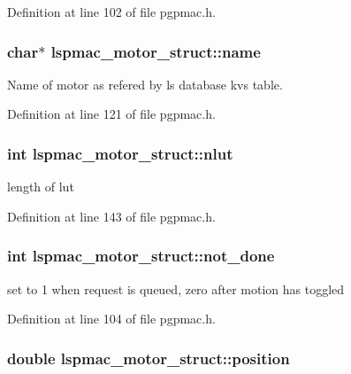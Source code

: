 Definition at line 102 of file pgpmac.\-h.

\hypertarget{structlspmac__motor__struct_aa90af2f6f1489f1befe1d0891e51575a}{
\subsubsection[{name}]{\setlength{\rightskip}{0pt plus 5cm}char$\ast$ lspmac\-\_\-motor\-\_\-struct\-::name}}\label{structlspmac__motor__struct_aa90af2f6f1489f1befe1d0891e51575a}


Name of motor as refered by ls database kvs table. 



Definition at line 121 of file pgpmac.\-h.

\hypertarget{structlspmac__motor__struct_a11cbc6f50c150ed446e9a901cf7cc12b}{
\subsubsection[{nlut}]{\setlength{\rightskip}{0pt plus 5cm}int lspmac\-\_\-motor\-\_\-struct\-::nlut}}\label{structlspmac__motor__struct_a11cbc6f50c150ed446e9a901cf7cc12b}


length of lut 



Definition at line 143 of file pgpmac.\-h.

\hypertarget{structlspmac__motor__struct_ab7bd8bff48953ce05c758598d75877ac}{
\subsubsection[{not\-\_\-done}]{\setlength{\rightskip}{0pt plus 5cm}int lspmac\-\_\-motor\-\_\-struct\-::not\-\_\-done}}\label{structlspmac__motor__struct_ab7bd8bff48953ce05c758598d75877ac}


set to 1 when request is queued, zero after motion has toggled 



Definition at line 104 of file pgpmac.\-h.

\hypertarget{structlspmac__motor__struct_af8ffb3aed907d8664b65b37601954411}{
\subsubsection[{position}]{\setlength{\rightskip}{0pt plus 5cm}double lspmac\-\_\-motor\-\_\-struct\-::position}}\label{structlspmac__motor__struct_af8ffb3aed907d8664b65b37601954411}


